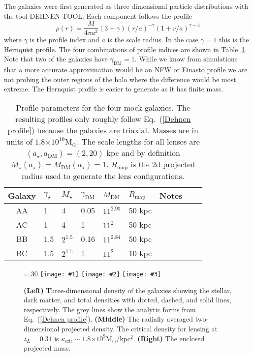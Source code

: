 \documentclass[galley]{mn2e}
\newcommand{\Rmap}{\ensuremath{R_\mathrm{map}}}
\newcommand{\Msun}{\ensuremath{\mathrm{M}_\odot}}
\newcommand{\tabref}[1] {Table~\ref{#1}}
\newcommand{\eqnref}[1] {Eq.~(\ref{#1})}
\newcommand{\e}[1]{\ensuremath{\times 10^{#1}}}
\newcommand\plotone[1]{%
 \centering
 \leavevmode
 \texttt{[image: \#1]}%
}%
\newcommand\plotthree[3]{{%
 \centering
 \leavevmode
 \columnwidth=.30\columnwidth
 \texttt{[image: \#1]}%
 \hfil
 \texttt{[image: \#2]}%
 \hfil
 \texttt{[image: \#3]}%
}}%
\begin{document}
The galaxies were
first generated as three dimensional particle distributions with the
tool DEHNEN-TOOL. Each component follows the profile
\begin{equation}
\rho(r) = \frac{M}{4\pi a^3}(3-\gamma){(r/a)^{-\gamma}(1 + r/a)^{\gamma-4}}
\label{Dehnen profile}
\end{equation}
where $\gamma$ is the profile index and $a$ is the scale radius.  In the
case $\gamma=1$ this is the Hernquist profile.  The four combinations of
profile indices are shown in \tabref{mock galaxy params}.  Note that two of
the galaxies have $\gamma_\mathrm{DM}=1$. While we know from simulations that a
more accurate approximation would be an NFW or Einasto profile we are not
probing the outer regions of the halo where the difference would be most
extreme.  The Hernquist profile is easier to generate as it has finite mass.

\begin{table}
\begin{tabular}{cllllllll}
Galaxy & $\gamma_\star$ & $M_\star$ & $\gamma_\mathrm{DM}$ & $M_\mathrm{DM}$ & $\Rmap$ & Notes\\
\hline
AA & 1 & 4 & 0.05 & $11^{2.95}$ & 50 kpc & \\
AC & 1 & 4 & 1 & $11^2$ & 50 kpc & \\
BB & 1.5 & $2^{1.5}$ & 0.16 & $11^{2.84}$ & 50 kpc & \\
BC & 1.5 & $2^{1.5}$ & 1 & $11^2$ & 10 kpc & 
\end{tabular}
\caption{Profile parameters for the four mock galaxies. The resulting profiles only roughly follow
\eqnref{Dehnen profile} because the galaxies are triaxial. Masses are in units of $1.8\e{10}\Msun$. The scale lengths for
all lenses are $(a_\star,a_\mathrm{DM})=(2,20)$ kpc and by definition
$M_\star(a_\star) = M_\mathrm{DM}(a_\star) = 1$. $\Rmap$ is the 2d projected radius used to generate the lens configurations.}
\label{mock galaxy params}
\end{table}

\begin{figure}
\plotthree{MockGalProfile-a.pdf} {MockGalProfile-b.pdf} {MockGalProfile-c.pdf}
\caption{
\textbf{(Left)} 
Three-dimensional density of the galaxies showing the stellar, dark matter,
and total densities with dotted, dashed, and solid lines, respectively. The
grey lines show the analytic forms from \eqnref{Dehnen profile}. 
\textbf{(Middle)} 
The radially averaged two-dimensional projected density.
The critical density for lensing at $z_L=0.31$ is $\kappa_\mathrm{crit}\sim 1.8\e{9}$\Msun/kpc$^2$.
\textbf{(Right)}
The enclosed projected mass.
}
\label{mock galaxies}
\end{figure}
\end{document}
